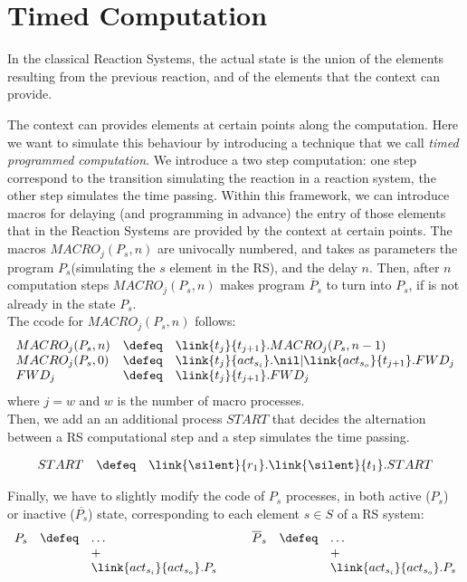 
\section{Timed Computation}

In the classical Reaction Systems, the actual state is the union of the elements resulting from the 
previous reaction, and of the elements that the context can provide.

The context can provides elements at certain points along the computation. Here we want to 
simulate this behaviour by introducing a technique that we call \emph{timed programmed computation}.
We introduce a two step computation: one step correspond to the transition simulating the reaction in a reaction system, the other step simulates the time passing.
Within this framework, we can introduce macros for delaying (and programming in advance) the entry
of those elements that in the Reaction Systems are provided by the context at certain points.
The macros $MACRO_j(P_s,n)$ are univocally numbered, and takes as parameters the program  $P_s$(simulating the $s$ element in the RS), and the delay $n$. Then, after $n$ computation steps  $MACRO_j(P_s,n)$  makes program $\overline{P}_s$ to turn into $P_s$, if is not already in the state $P_s$.\\
The c\CNA code for $MACRO_j(P_s,n)$ follows:
\[
\begin{array}{lcl}
MACRO_j(P_s,n) &\defeq & \link{t_j}{t_{j+1}}.MACRO_j(P_s,n-1)\\
MACRO_j(P_s,0) & \defeq & \link{t_j}{act_{s_i}}.\nil | \link{act_{s_o}}{t_{j+1}}.FWD_j\\
FWD_j & \defeq & \link{t_j}{t_{j+1}}.FWD_j\\
\end{array}
\] 
where $j = w$ and $w$ is the number of macro processes.\\
Then, we add an an additional process $START$ that decides the alternation between a RS computational step and a step simulates the time passing.

\[
\begin{array}{lcl}
START& \defeq &\link{\silent}{r_1}.\link{\silent}{t_1}.START
\end{array}
\]

Finally, we have to slightly  modify the code of $P_s$ processes, in both  active ($P_s$) or inactive ($\overline{P_s}$) state, corresponding to each element $s \in S$ of a RS system:
\[
\begin{array}{lcl@{\hspace {1cm}} lcl}
P_s &\defeq &   \dots  & \overline{P}_s &\defeq &   \dots \\
 && +  & && +\\
 && \link{act_{s_i}}{act_{s_o}}.P_s &
  && \link{act_{s_i}}{act_{s_o}}.P_s
\end{array}
\] 

